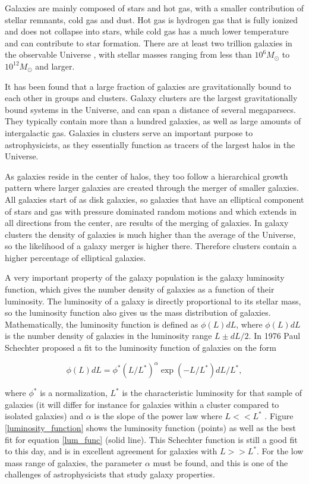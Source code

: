 Galaxies are mainly composed of stars and hot gas, with a smaller contribution of stellar remnants, cold gas and dust. Hot gas is hydrogen gas that is fully ionized and does not collapse into stars, while cold gas has a much lower temperature and can contribute to star formation. There are at least two trillion galaxies in the observable Universe \parencite{Conselice2016}, with stellar masses ranging from less than $10^6 M_{\odot}$ to $10^{12} M_{\odot}$ and larger. 

It has been found that a large fraction of galaxies are gravitationally bound to each other in groups and clusters.
Galaxy clusters are the largest gravitationally bound systems in the Universe, and can span a distance of several megaparsecs. They typically contain more than a hundred galaxies, as well as large amounts of intergalactic gas. Galaxies in clusters serve an important purpose to astrophysicists, as they essentially function as tracers of the largest halos in the Universe.

As galaxies reside in the center of halos, they too follow a hierarchical growth pattern where larger galaxies are created through the merger of smaller galaxies. All galaxies start of as disk galaxies, so galaxies that have an elliptical component of stars and gas with pressure dominated random motions and which extends in all directions from the center, are results of the merging of galaxies. In galaxy clusters the density of galaxies is much higher than the average of the Universe, so the likelihood of a galaxy merger is higher there. Therefore clusters contain a higher percentage of elliptical galaxies.

A very important property of the galaxy population is the galaxy luminosity function, which gives the number density of galaxies as a function of their luminosity. The luminosity of a galaxy is directly proportional to its stellar mass, so the luminosity function also gives us the mass distribution of galaxies. Mathematically, the luminosity function is defined as $\phi(L)dL$, where $\phi(L)dL$ is the number density of galaxies in the luminosity range $L \pm dL/2$. In 1976 Paul Schechter proposed a fit to the luminosity function of galaxies on the form

\begin{equation} \label{lum_func}
    \phi(L)dL = \phi^*(L/L^*)^{\alpha}\exp{(-L/L^*)}dL/L^*,
\end{equation}

where $\phi^*$ is a normalization, $L^*$ is the characteristic luminosity for that sample of galaxies (it will differ for instance for galaxies within a cluster compared to isolated galaxies) and $\alpha$ is the slope of the power law where $L<<L^*$ \parencite{Schechter1976}. Figure \ref{luminosity_function} shows the luminosity function (points) as well as the best fit for equation \ref{lum_func} (solid line). This Schechter function is still a good fit to this day, and is in excellent agreement for galaxies with $L>>L^*$. For the low mass range of galaxies, the parameter $\alpha$ must be found, and this is one of the challenges of astrophysicists that study galaxy properties.

